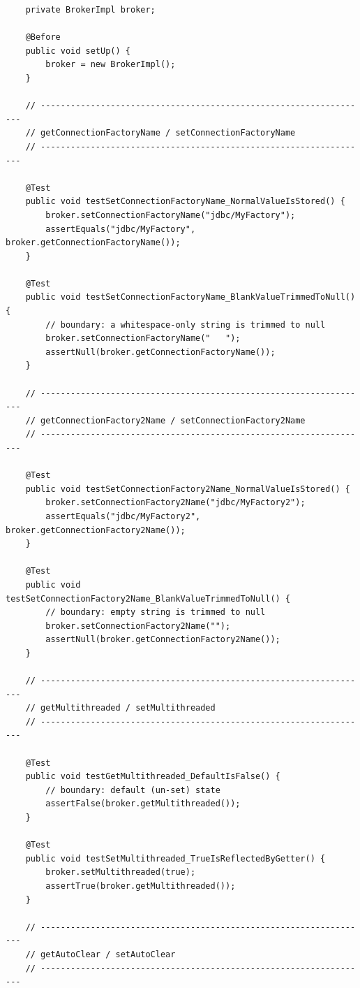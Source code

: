 \begin{lstlisting}
    private BrokerImpl broker;

    @Before
    public void setUp() {
        broker = new BrokerImpl();
    }

    // ------------------------------------------------------------------
    // getConnectionFactoryName / setConnectionFactoryName
    // ------------------------------------------------------------------

    @Test
    public void testSetConnectionFactoryName_NormalValueIsStored() {
        broker.setConnectionFactoryName("jdbc/MyFactory");
        assertEquals("jdbc/MyFactory", broker.getConnectionFactoryName());
    }

    @Test
    public void testSetConnectionFactoryName_BlankValueTrimmedToNull() {
        // boundary: a whitespace-only string is trimmed to null
        broker.setConnectionFactoryName("   ");
        assertNull(broker.getConnectionFactoryName());
    }

    // ------------------------------------------------------------------
    // getConnectionFactory2Name / setConnectionFactory2Name
    // ------------------------------------------------------------------

    @Test
    public void testSetConnectionFactory2Name_NormalValueIsStored() {
        broker.setConnectionFactory2Name("jdbc/MyFactory2");
        assertEquals("jdbc/MyFactory2", broker.getConnectionFactory2Name());
    }

    @Test
    public void testSetConnectionFactory2Name_BlankValueTrimmedToNull() {
        // boundary: empty string is trimmed to null
        broker.setConnectionFactory2Name("");
        assertNull(broker.getConnectionFactory2Name());
    }

    // ------------------------------------------------------------------
    // getMultithreaded / setMultithreaded
    // ------------------------------------------------------------------

    @Test
    public void testGetMultithreaded_DefaultIsFalse() {
        // boundary: default (un-set) state
        assertFalse(broker.getMultithreaded());
    }

    @Test
    public void testSetMultithreaded_TrueIsReflectedByGetter() {
        broker.setMultithreaded(true);
        assertTrue(broker.getMultithreaded());
    }

    // ------------------------------------------------------------------
    // getAutoClear / setAutoClear
    // ------------------------------------------------------------------


\end{lstlisting}
